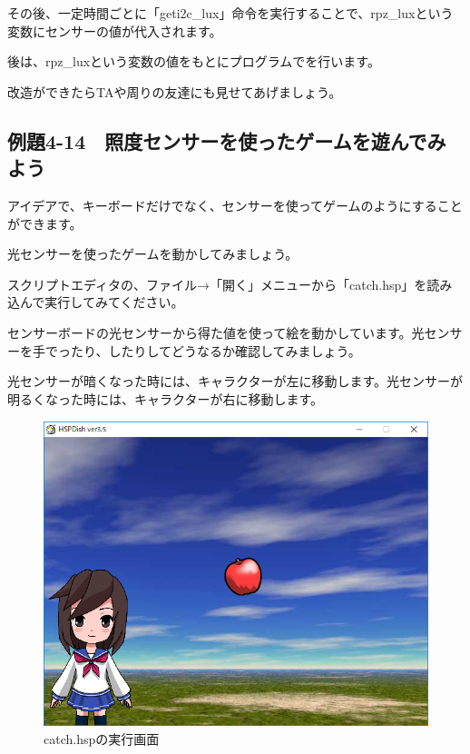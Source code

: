 その後、一定時間ごとに「geti2c\_lux」命令を実行することで、rpz\_luxという変数にセンサーの値が代入されます。

後は、rpz\_luxという変数の値をもとにプログラムでを行います。

改造ができたらTAや周りの友達にも見せてあげましょう。

\newpage
\subsection{例題4-14　照度センサーを使ったゲームを遊んでみよう}

\begin{description}
    \item {}
\end{description}


アイデアで、キーボードだけでなく、センサーを使ってゲームのようにすることができます。

光センサーを使ったゲームを動かしてみましょう。


スクリプトエディタの、ファイル→「開く」メニューから「catch.hsp」を読み込んで実行してみてください。


\begin{description}
    \item {}
\end{description}

センサーボードの光センサーから得た値を使って絵を動かしています。光センサーを手でったり、したりしてどうなるか確認してみましょう。

光センサーが暗くなった時には、キャラクターが左に移動します。光センサーが明るくなった時には、キャラクターが右に移動します。


\begin{figure}[H]
    \begin{center}
      \includegraphics[keepaspectratio,width=11.269cm,height=8.89cm]{text04-img/s_catch.png}
      \caption{catch.hspの実行画面}
    \end{center}
    \label{fig:prog_menu}
\end{figure}


